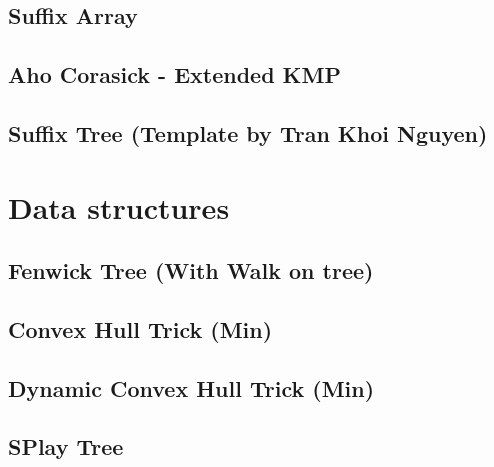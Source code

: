 \subsection{Suffix Array}
\raggedbottom
\hrulefill
\subsection{Aho Corasick - Extended KMP}
\raggedbottom
\hrulefill
\subsection{Suffix Tree (Template by Tran Khoi Nguyen)}
\raggedbottom
\hrulefill

\section{Data structures}
\subsection{Fenwick Tree (With Walk on tree)}
\raggedbottom
\hrulefill
\subsection{Convex Hull Trick (Min)}
\raggedbottom
\hrulefill
\subsection{Dynamic Convex Hull Trick (Min)}
\raggedbottom
\hrulefill
\subsection{SPlay Tree}
\raggedbottom
\hrulefill

